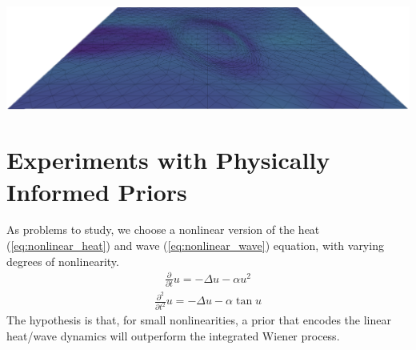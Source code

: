 \begin{center}
    \includegraphics[width=\columnwidth]{../images/bell_wave_3.png}\vspace*{3mm}
    \label{fig:bell_wave}
\end{center}

\section{Experiments with Physically Informed Priors}
As problems to study, we choose a nonlinear version of the heat (\ref{eq:nonlinear_heat}) and wave (\ref{eq:nonlinear_wave}) equation, with varying degrees of nonlinearity. 
\begin{align}
    \frac{\partial}{\partial t}u = -\Delta u - \alpha u^2\label{eq:nonlinear_heat}
\end{align}
\begin{align}
    \frac{\partial^2}{\partial t^2}u = -\Delta u - \alpha\tan u\label{eq:nonlinear_wave}
\end{align}
The hypothesis is that, for small nonlinearities, a prior that encodes the linear heat/wave dynamics will outperform the integrated Wiener process. 

